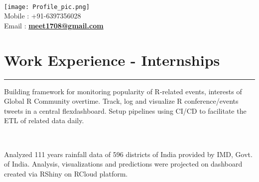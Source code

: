 \documentclass[]{meetresume-class}
\begin{document}
	\begin{minipage}[t]{0.66\textwidth} 
		\hspace*{0pt}\hfill    \\
		\hspace*{0pt}\hfill \texttt{[image: Profile\_pic.png]}\\
		\hspace*{0pt}\hfill Mobile : +91-6397356028 \\
		\hspace*{0pt}\hfill Email : \textbf{\href{mailto:meet1708@gmail.com}{meet1708@gmail.com}}

		\section{Work Experience - Internships}
		\noindent\rule{12.5cm}{0.4pt}
		 
		\noindent
		\hspace{5em}%
		\begin{minipage}{0.85\textwidth\vspace{2pt}}
			 Building framework for monitoring popularity of R-related events, interests of Global R Community overtime. Track, log and visualize R conference/events tweets in a central flexdashboard. Setup pipelines using CI/CD to facilitate the ETL of related data daily.
		\end{minipage}
		\sectionsep
		\hspace*{0pt}\hfill  \\
		
		 
		\noindent
		\hspace{5em}%
		\begin{minipage}{0.85\textwidth\vspace{2pt}}
			Analyzed 111 years rainfall data of 596 districts of India provided by IMD, Govt. of India. Analysis, visualizations and predictions were projected on dashboard created via RShiny on RCloud platform.
		\end{minipage}
		\sectionsep
		

\end{minipage}
\end{document}
